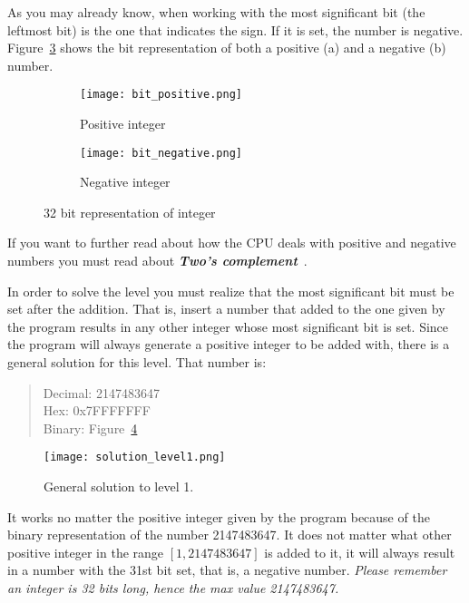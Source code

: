 As you may already know, when working with  the most significant bit (the leftmost bit) is the one that indicates the sign. If it is set, the number is negative. Figure~\ref{fig:bit_representation} shows the bit representation of both a positive (a) and a negative (b) number.

\begin{figure}
	\begin{subfigure}[t]{.5\textwidth}
		\centering
		\texttt{[image: bit\_positive.png]}
		\caption{Positive integer}
		\label{fig:sub_positive_int}
	\end{subfigure}
	\begin{subfigure}[t]{.5\textwidth}
		\centering
		\texttt{[image: bit\_negative.png]}
		\caption{Negative integer}
		\label{fig:sub_negative_int}
	\end{subfigure}
	\caption{32 bit representation of integer}
	\label{fig:bit_representation}
\end{figure}


If you want to further read about how the CPU deals with positive and negative numbers you must read about \textbf{\textit{Two's complement}}~\cite{TwosComplementWikipedia,lyon1976two}.

In order to solve the level you must realize that the most significant bit must be set after the addition. That is, insert a number that added to the one given by the program results in any other integer whose most significant bit is set. Since the program will always generate a positive integer to be added with, there is a general solution for this level. That number is:
\begin{quote}
	Decimal: 2147483647\\
	Hex: 0x7FFFFFFF\\
	Binary: Figure~\ref{fig:solution_level_1}
\end{quote}

\begin{figure}
	\centering
	\texttt{[image: solution\_level1.png]}
	\caption{General solution to level 1.}
	\label{fig:solution_level_1}
\end{figure}

It works no matter the positive integer given by the program because of the binary representation of the number 2147483647. It does not matter what other positive integer in the range $[1, 2147483647]$ is added to it, it will always result in a number with the 31st bit set, that is, a negative number. \textit{Please remember an integer  is 32 bits long, hence the max value 2147483647.}

